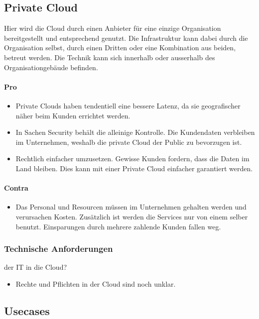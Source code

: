 \subsection{Private Cloud}
Hier wird die Cloud durch einen Anbieter für eine einzige Organisation bereitgestellt und entsprechend genutzt. Die Infrastruktur kann dabei durch die Organisation selbst, durch einen Dritten oder eine Kombination aus beiden, betreut werden. Die Technik kann sich innerhalb oder ausserhalb des Organisationgebäude befinden.
\paragraph{Pro}
\begin{itemize}
	\item Private Clouds haben tendentiell eine bessere Latenz, da sie geografischer näher beim Kunden errichtet werden. 
	\item In Sachen Security behält die alleinige Kontrolle. Die Kundendaten verbleiben im Unternehmen, weshalb die private Cloud der Public zu bevorzugen ist.
	\item Rechtlich einfacher umzusetzen. Gewisse Kunden fordern, dass die Daten im Land bleiben. Dies kann mit einer Private Cloud einfacher garantiert werden.
\end{itemize}

\paragraph{Contra}
\begin{itemize}
	\item Das Personal und Resourcen müssen im Unternehmen gehalten werden und verursachen Kosten. Zusätzlich ist werden die Services nur von einem selber benutzt. Einsparungen durch mehrere zahlende Kunden fallen weg.
\end{itemize}


\subsubsection{Technische Anforderungen}
der IT in die Cloud? 
\begin{itemize}
	\item Rechte und Pflichten in der Cloud sind noch unklar.
\end{itemize}


\subsection{Usecases}
